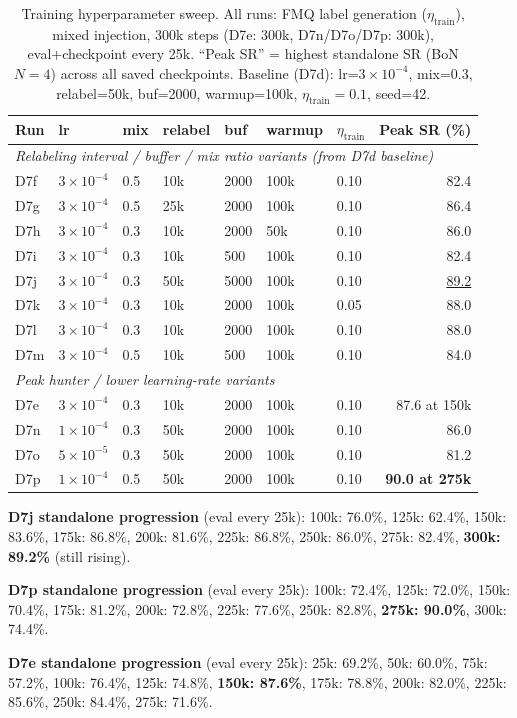 \documentclass[11pt]{article}
\newcommand{\best}[1]{\textbf{#1}}
\newcommand{\ours}[1]{\underline{#1}}
\begin{document}
\begin{table}[h]
\centering
\caption{Training hyperparameter sweep.
  All runs: FMQ label generation ($\eta_{\text{train}}$), mixed injection,
  300k steps (D7e: 300k, D7n/D7o/D7p: 300k), eval+checkpoint every 25k.
  ``Peak SR'' = highest standalone SR (BoN $N=4$) across all saved checkpoints.
  Baseline (D7d): lr=$3\times10^{-4}$, mix=0.3, relabel=50k, buf=2000, warmup=100k,
  $\eta_\text{train}=0.1$, seed=42.}
\begin{tabular}{lllllllr}
\toprule
Run & lr & mix & relabel & buf & warmup & $\eta_\text{train}$ & Peak SR (\%) \\
\midrule
\multicolumn{8}{l}{\textit{Relabeling interval / buffer / mix ratio variants (from D7d baseline)}} \\
D7f & $3\!\times\!10^{-4}$ & 0.5 & 10k  & 2000 & 100k & 0.10 & 82.4 \\
D7g & $3\!\times\!10^{-4}$ & 0.5 & 25k  & 2000 & 100k & 0.10 & 86.4 \\
D7h & $3\!\times\!10^{-4}$ & 0.3 & 10k  & 2000 &  50k & 0.10 & 86.0 \\
D7i & $3\!\times\!10^{-4}$ & 0.3 & 10k  &  500 & 100k & 0.10 & 82.4 \\
D7j & $3\!\times\!10^{-4}$ & 0.3 & 50k  & 5000 & 100k & 0.10 & \ours{89.2} \\
D7k & $3\!\times\!10^{-4}$ & 0.3 & 10k  & 2000 & 100k & 0.05 & 88.0 \\
D7l & $3\!\times\!10^{-4}$ & 0.3 & 10k  & 2000 & 100k & 0.10 & 88.0 \\
D7m & $3\!\times\!10^{-4}$ & 0.5 & 10k  &  500 & 100k & 0.10 & 84.0 \\
\midrule
\multicolumn{8}{l}{\textit{Peak hunter / lower learning-rate variants}} \\
D7e & $3\!\times\!10^{-4}$ & 0.3 & 10k  & 2000 & 100k & 0.10 & 87.6 at 150k \\
D7n & $1\!\times\!10^{-4}$ & 0.3 & 50k  & 2000 & 100k & 0.10 & 86.0 \\
D7o & $5\!\times\!10^{-5}$ & 0.3 & 50k  & 2000 & 100k & 0.10 & 81.2 \\
D7p & $1\!\times\!10^{-4}$ & 0.5 & 50k  & 2000 & 100k & 0.10 & \best{90.0 at 275k} \\
\bottomrule
\end{tabular}

\medskip
\footnotesize
\noindent\textbf{D7j standalone progression} (eval every 25k):
100k: 76.0\%, 125k: 62.4\%, 150k: 83.6\%, 175k: 86.8\%, 200k: 81.6\%,
225k: 86.8\%, 250k: 86.0\%, 275k: 82.4\%, \textbf{300k: 89.2\%} (still rising).

\noindent\textbf{D7p standalone progression} (eval every 25k):
100k: 72.4\%, 125k: 72.0\%, 150k: 70.4\%, 175k: 81.2\%, 200k: 72.8\%,
225k: 77.6\%, 250k: 82.8\%, \textbf{275k: 90.0\%}, 300k: 74.4\%.

\noindent\textbf{D7e standalone progression} (eval every 25k):
25k: 69.2\%, 50k: 60.0\%, 75k: 57.2\%, 100k: 76.4\%, 125k: 74.8\%,
\textbf{150k: 87.6\%}, 175k: 78.8\%, 200k: 82.0\%, 225k: 85.6\%, 250k: 84.4\%, 275k: 71.6\%.
\normalsize
\end{table}
\end{document}

